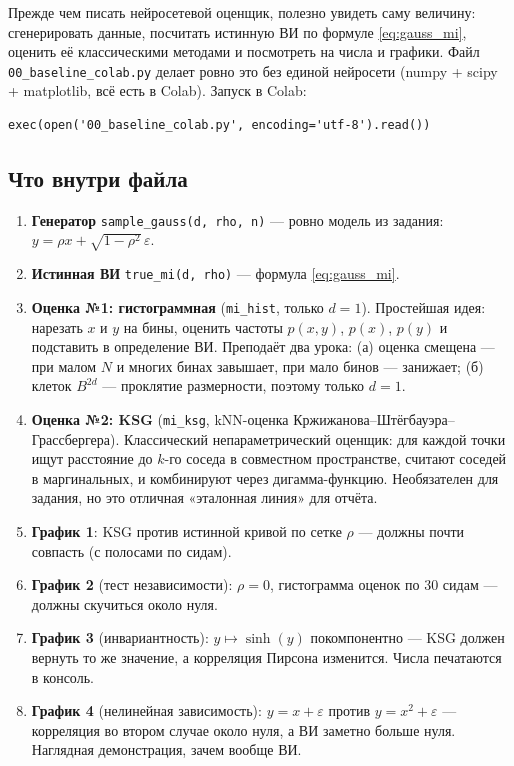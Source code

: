 \documentclass[11pt]{article}
\begin{document}
Прежде чем писать нейросетевой оценщик, полезно увидеть саму величину: сгенерировать данные, посчитать истинную ВИ по формуле \eqref{eq:gauss_mi}, оценить её классическими методами и посмотреть на числа и графики. Файл \texttt{00\_baseline\_colab.py} делает ровно это без единой нейросети (numpy + scipy + matplotlib, всё есть в Colab). Запуск в Colab:

\begin{verbatim}
exec(open('00_baseline_colab.py', encoding='utf-8').read())
\end{verbatim}

\subsection{Что внутри файла}

\begin{enumerate}[label=\arabic*.]
\item \textbf{Генератор} \texttt{sample\_gauss(d, rho, n)} — ровно модель из задания: $y=\rho x+\sqrt{1-\rho^2}\,\varepsilon$.
\item \textbf{Истинная ВИ} \texttt{true\_mi(d, rho)} — формула \eqref{eq:gauss_mi}.
\item \textbf{Оценка №1: гистограммная} (\texttt{mi\_hist}, только $d=1$). Простейшая идея: нарезать $x$ и $y$ на бины, оценить частоты $p(x,y)$, $p(x)$, $p(y)$ и подставить в определение ВИ. Преподаёт два урока: (а) оценка смещена — при малом $N$ и многих бинах завышает, при мало бинов — занижает; (б) клеток $B^{2d}$ — проклятие размерности, поэтому только $d=1$.
\item \textbf{Оценка №2: KSG} (\texttt{mi\_ksg}, kNN-оценка Кржижанова–Штёгбауэра–Грассбергера). Классический непараметрический оценщик: для каждой точки ищут расстояние до $k$-го соседа в совместном пространстве, считают соседей в маргинальных, и комбинируют через дигамма-функцию. Необязателен для задания, но это отличная «эталонная линия» для отчёта.
\item \textbf{График 1}: KSG против истинной кривой по сетке $\rho$ — должны почти совпасть (с полосами по сидам).
\item \textbf{График 2} (тест независимости): $\rho=0$, гистограмма оценок по 30 сидам — должны скучиться около нуля.
\item \textbf{График 3} (инвариантность): $y\mapsto\sinh(y)$ покомпонентно — KSG должен вернуть то же значение, а корреляция Пирсона изменится. Числа печатаются в консоль.
\item \textbf{График 4} (нелинейная зависимость): $y=x+\varepsilon$ против $y=x^2+\varepsilon$ — корреляция во втором случае около нуля, а ВИ заметно больше нуля. Наглядная демонстрация, зачем вообще ВИ.
\end{enumerate}
\end{document}
